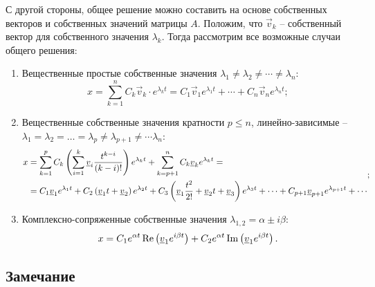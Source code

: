 	С другой стороны, общее решение можно составить на основе собственных векторов и собственных значений матрицы $A$. Положим, что $\vec{v}_k$ -- собственный вектор для собственного значения $\lambda_k$. Тогда рассмотрим все возможные случаи общего решения:
	\begin{enumerate}
		\item Вещественные простые собственные значения $\lambda_1 \neq \lambda_2 \neq \cdots \neq \lambda_n$:
		\[ x = \sum_{k = 1}^n C_k \vec{v}_k \cdot e^{\lambda_k t} = C_1 \vec{v}_1 e^{\lambda_1 t} + \cdots + C_n \vec{v}_n e^{\lambda_n t}; \]
		\item Вещественные собственные значения кратности $p \leq n$, линейно-зависимые -- $\lambda_1 = \lambda_2 = \dots = \lambda_p \neq \lambda_{p+1} \neq \cdots \lambda_n$:
		\[ \begin{split} 
			x &= \sum_{k = 1}^p C_k \left( \sum_{i = 1}^{k} \underline{v}_i \frac{t^{k-i}}{\left( k-i \right)!} \right) e^{\lambda_k t} + \sum_{k = p+1}^{n} C_k \underline{v}_k e^{\lambda_k t} = \\
			&= C_1 \underline{v}_1 e^{\lambda_1 t} + C_2 \left( \underline{v}_1 t + \underline{v}_2 \right) e^{\lambda_2 t} + C_3 \left( \underline{v}_1 \frac{t^2}{2!} + \underline{v}_2 t + \underline{v}_3 \right) e^{\lambda_3 t} + \cdots + C_{p+1} \underline{v}_{p+1} e^{\lambda_{p+1} t} + \cdots
		\end{split}; \]
		\item Комплексно-сопряженные собственные значения $\lambda_{1, 2} = \alpha \pm i \beta$:
		\[ x = C_1 e^{\alpha t} \operatorname{Re}\left( \underline{v}_1 e^{i\beta t} \right) + C_2 e^{\alpha t} \operatorname{Im}\left( \underline{v}_1 e^{i\beta t} \right). \]
	\end{enumerate}

	\subsection*{Замечание}

